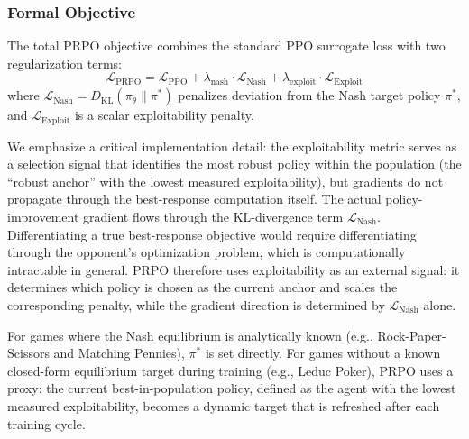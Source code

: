 \documentclass[sigconf,anonymous]{aamas}
\begin{document}
\subsubsection{Formal Objective}
The total PRPO objective combines the standard PPO surrogate loss with two regularization terms:
\begin{equation}
\mathcal{L}_{\text{PRPO}} = \mathcal{L}_{\text{PPO}} + \lambda_{\text{nash}} \cdot \mathcal{L}_{\text{Nash}} + \lambda_{\text{exploit}} \cdot \mathcal{L}_{\text{Exploit}}
\label{eq:prpo_objective}
\end{equation}
where $\mathcal{L}_{\text{Nash}} = D_{\text{KL}}(\pi_\theta \| \pi^*)$ penalizes deviation from the Nash target policy $\pi^*$, and $\mathcal{L}_{\text{Exploit}}$ is a scalar exploitability penalty.

We emphasize a critical implementation detail: the exploitability metric serves as a selection signal that identifies the most robust policy within the population (the ``robust anchor'' with the lowest measured exploitability), but gradients do not propagate through the best-response computation itself. The actual policy-improvement gradient flows through the KL-divergence term $\mathcal{L}_{\text{Nash}}$. Differentiating a true best-response objective would require differentiating through the opponent's optimization problem, which is computationally intractable in general. PRPO therefore uses exploitability as an external signal: it determines which policy is chosen as the current anchor and scales the corresponding penalty, while the gradient direction is determined by $\mathcal{L}_{\text{Nash}}$ alone.

For games where the Nash equilibrium is analytically known (e.g., Rock-Paper-Scissors and Matching Pennies), $\pi^*$ is set directly. For games without a known closed-form equilibrium target during training (e.g., Leduc Poker), PRPO uses a proxy: the current best-in-population policy, defined as the agent with the lowest measured exploitability, becomes a dynamic target that is refreshed after each training cycle.
\end{document}
